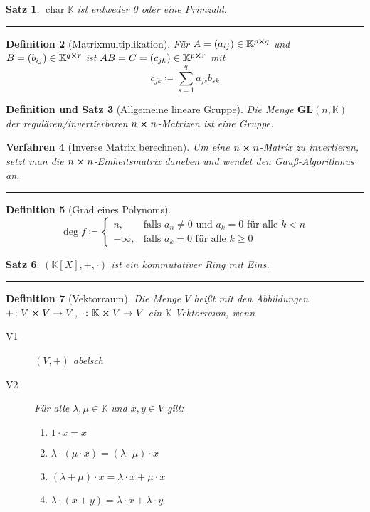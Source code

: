 \documentclass[a4paper]{article}
\newcounter{Sec}
\theoremstyle{marginbreak}
\newtheorem{definition}{Definition}[Sec]
\newtheorem{satz}[definition]{Satz}
\newtheorem{defsatz}[definition]{Definition und Satz}
\newtheorem{verfahren}[definition]{Verfahren}
\DeclareMathOperator{\chop}{char}
\newcommand{\sep}{%
	\rule{\textwidth}{0.3pt}%
	\stepcounter{Sec}%
	}
\begin{document}
	\begin{satz}
		$\chop\mathbb{K}$ ist entweder 0 oder eine Primzahl.
	\end{satz}
	\sep
	\begin{definition}[Matrixmultiplikation]
		Für $A = (a_{ij}) \in \mathbb{K}^{p\cross q}$ und $B = (b_{ij}) \in \mathbb{K}^{q\cross r}$
		ist $AB = C = (c_{jk}) \in \mathbb{K}^{p\cross r}$ mit
		\[ c_{jk} \coloneqq \sum_{s = 1}^q a_{js}b_{sk}\]
	\end{definition}
	\begin{defsatz}[Allgemeine lineare Gruppe]
		Die Menge $\mathbf{GL}(n, \mathbb{K})$ der regulären/invertierbaren $n\cross n$-Matrizen ist eine Gruppe.
	\end{defsatz}
	\begin{verfahren}[Inverse Matrix berechnen]
		Um eine $n\cross n$-Matrix zu invertieren, setzt man die $n\cross n$-Einheitsmatrix daneben und wendet
		den Gauß-Algorithmus an.
	\end{verfahren}
	\sep
	\begin{definition}[Grad eines Polynoms]
		\[\deg f\coloneqq\begin{cases}
			n, &\text{falls $a_n \neq 0$ und $a_k = 0$ für alle $k < n$}\\
			-\infty,  &\text{falls $a_k = 0$ für alle $k \geq 0$}
		\end{cases}\]
	\end{definition}
	\begin{satz}
		$(\mathbb{K}[X], +, \cdot)$ ist ein kommutativer Ring mit Eins.
	\end{satz}
	\sep
	\begin{definition}[Vektorraum]
		Die Menge $V$ heißt mit den Abbildungen $+\colon V\cross V\to V$, $\cdot\colon\mathbb{K}\cross V\to V$ ein $\mathbb{K}$-Vektorraum, wenn
		\begin{description}
			\item[V1] $(V, +)$ abelsch
			\item[V2] Für alle $\lambda,\mu\in\mathbb{K}$ und $x, y\in V$ gilt:
				\begin{enumerate}[label=(\alph*)]
					\item $1 \cdot x = x$
					\item $\lambda \cdot (\mu \cdot x) = (\lambda \cdot \mu) \cdot x$
					\item $(\lambda + \mu) \cdot x = \lambda \cdot x + \mu \cdot x$
					\item $\lambda \cdot (x + y) = \lambda \cdot x + \lambda \cdot y$
				\end{enumerate}
		\end{description}
	\end{definition}
\end{document}
